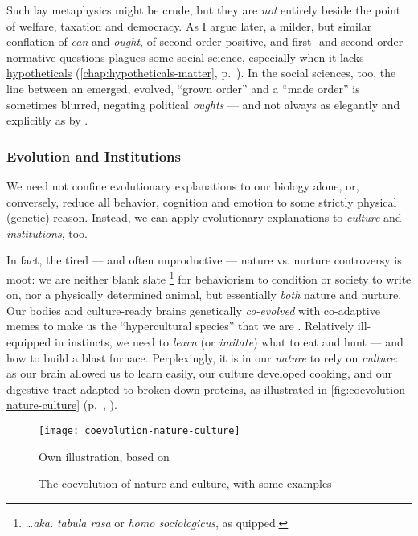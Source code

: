Such lay metaphysics might be crude, but they are \emph{not} entirely beside the point of welfare, taxation and democracy. 
As I argue later, a milder, but similar conflation of \emph{can} and \emph{ought}, of second-order positive, and first- and second-order normative questions plagues some social science, especially when it \hyperref[chap:hypotheticals-matter]{lacks hypotheticals} (\autoref{chap:hypotheticals-matter}, p.~\pageref{chap:hypotheticals-matter}). 
In the social sciences, too, the line between an emerged, evolved, ``grown order'' and a ``made order'' is sometimes blurred, negating political \emph{oughts} --- and not always as elegantly and explicitly as by \cite[37]{Hayek1973}.

\subsubsection{Evolution and Institutions}
We need not confine evolutionary explanations to our biology alone, or, conversely, reduce all behavior, cognition and emotion to some strictly physical (genetic) reason. 
Instead, we can apply evolutionary explanations to \emph{culture} and \emph{institutions}, too. 

In fact, the tired --- and often unproductive --- nature vs. nurture controversy is moot: we are neither blank slate
\footnote{
	\ldots \emph{aka.} \emph{tabula rasa} or \emph{homo sociologicus}, as \cite{Dahrendorf1965} quipped.
} 
for behaviorism to condition or society to write on, nor a physically determined animal, but essentially \emph{both} nature and nurture. 
Our bodies and culture-ready brains genetically \emph{co-evolved} with co-adaptive memes \citep{Dawkins1976} to make us the ``hypercultural species'' that we are \citep[K175]{Henrich2007}. 
Relatively ill-equipped in instincts, we need to \emph{learn} (or \emph{imitate}) what to eat and hunt --- and how to build a blast furnace. 
Perplexingly, it is in our \emph{nature} to rely on \emph{culture}: as our brain allowed us to learn easily, our culture developed cooking, and our digestive tract adapted to broken-down proteins, as illustrated in \autoref{fig:coevolution-nature-culture} (p.~\pageref{fig:coevolution-nature-culture}, \citealt[confer][]{Henrich2007}).

\begin{figure}[htbp]
	\begin{center}
	\texttt{[image: coevolution-nature-culture]}  
	\caption[Coevolution of Nature and Culture]{The coevolution of nature and culture, with some examples}	
	\end{center}
	\scriptsize{Own illustration, based on \citet[K120ff]{Henrich2007}}
	\label{fig:coevolution-nature-culture}
\end{figure}

